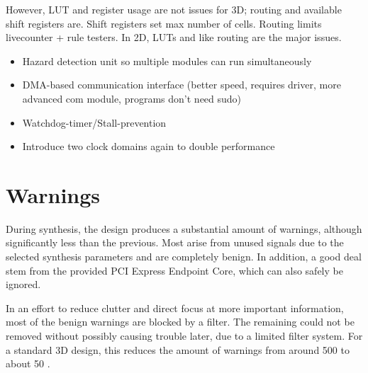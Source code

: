 However, LUT and register usage are not issues for 3D; routing and available shift registers are.
Shift registers set max number of cells.
Routing limits livecounter + rule testers.
In 2D, LUTs and like routing are the major issues.

\begin{itemize}
    \item Hazard detection unit so multiple modules can run simultaneously
    \item DMA-based communication interface (better speed, requires driver, more advanced com module, programs don't need sudo)
    \item Watchdog-timer/Stall-prevention
    \item Introduce two clock domains again to double performance
\end{itemize}


\section{Warnings}

During synthesis, the design produces a substantial amount of warnings, although significantly less than the previous.
Most arise from unused signals due to the selected synthesis parameters and are completely benign.
In addition, a good deal stem from the provided PCI Express Endpoint Core, which can also safely be ignored.

In an effort to reduce clutter and direct focus at more important information, most of the benign warnings are blocked by a filter.
The remaining could not be removed without possibly causing trouble later, due to a limited filter system.
For a standard 3D design, this reduces the amount of warnings from around 500 to about 50 \footnotemark.


